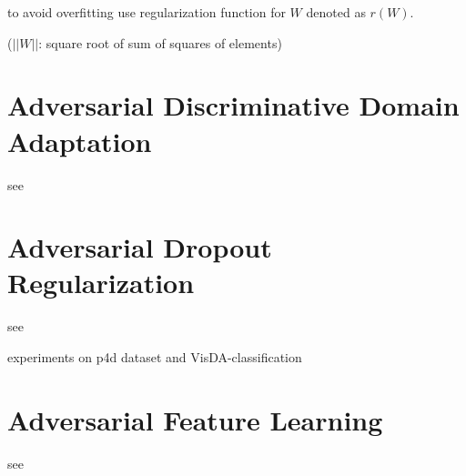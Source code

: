 to avoid overfitting use regularization function for $W$ denoted as $r(W)$. 


($||W||$: square root of sum of squares of elements)


\section{Adversarial Discriminative Domain Adaptation}

see \cite{DBLP:journals/corr/TzengHSD17}


\section{Adversarial Dropout Regularization}

see \cite{DBLP:journals/corr/abs-1711-01575}

experiments on p4d dataset and VisDA-classification\\

\section{Adversarial Feature Learning}

see \cite{DBLP:journals/corr/DonahueKD16}